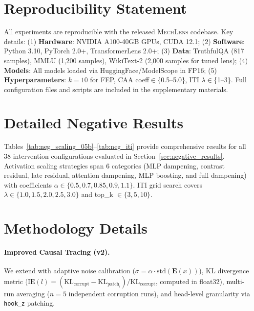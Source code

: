 \documentclass{article}
\newcommand{\mechlens}{\textsc{MechLens}}
\begin{document}
\section*{Reproducibility Statement}
All experiments are reproducible with the released \mechlens{} codebase. Key details: (1) \textbf{Hardware}: NVIDIA A100-40GB GPUs, CUDA 12.1; (2) \textbf{Software}: Python 3.10, PyTorch 2.0+, TransformerLens 2.0+; (3) \textbf{Data}: TruthfulQA (817 samples), MMLU (1,200 samples), WikiText-2 (2,000 samples for tuned lens); (4) \textbf{Models}: All models loaded via HuggingFace/ModelScope in FP16; (5) \textbf{Hyperparameters}: $k{=}10$ for FEP, CAA coeff$\in$\{0.5--5.0\}, ITI $\lambda\in$\{1--3\}. Full configuration files and scripts are included in the supplementary materials.




\appendix

\section{Detailed Negative Results}
\label{app:negative_results}

Tables~\ref{tab:neg_scaling_05b}--\ref{tab:neg_iti} provide comprehensive results for all 38 intervention configurations evaluated in Section~\ref{sec:negative_results}. Activation scaling strategies span 6 categories (MLP dampening, contrast residual, late residual, attention dampening, MLP boosting, and full dampening) with coefficients $\alpha \in \{0.5, 0.7, 0.85, 0.9, 1.1\}$. ITI grid search covers $\lambda \in \{1.0, 1.5, 2.0, 2.5, 3.0\}$ and top\_k $\in \{3, 5, 10\}$.

\section{Methodology Details}
\label{app:methods}

\paragraph{Improved Causal Tracing (v2).} We extend \citet{meng2022locating} with adaptive noise calibration ($\sigma = \alpha \cdot \text{std}(\mathbf{E}(x))$), KL divergence metric ($\text{IE}(l) = (\text{KL}_{\text{corrupt}} - \text{KL}_{\text{patch}_l}) / \text{KL}_{\text{corrupt}}$, computed in float32), multi-run averaging ($n{=}5$ independent corruption runs), and head-level granularity via \texttt{hook\_z} patching.
\end{document}

